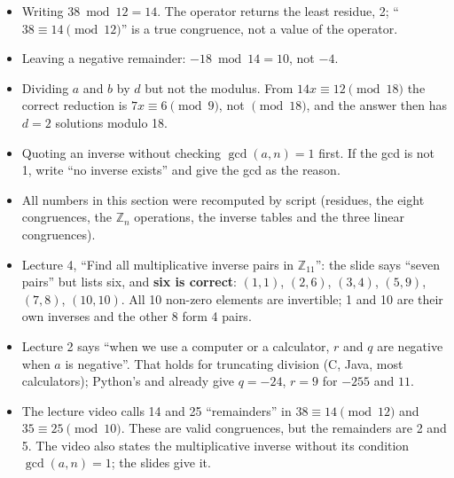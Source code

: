 \begin{trap}
\begin{itemize}[leftmargin=1.5em]
  \item Writing $38 \bmod 12 = 14$. The operator returns the least residue, 2; ``$38 \equiv 14 \pmod{12}$'' is a true congruence, not a value of the operator.
  \item Leaving a negative remainder: $-18 \bmod 14 = 10$, not $-4$.
  \item Dividing $a$ and $b$ by $d$ but not the modulus. From $14x \equiv 12 \pmod{18}$ the correct reduction is $7x \equiv 6 \pmod 9$, not $\pmod{18}$, and the answer then has $d = 2$ solutions modulo 18.
  \item Quoting an inverse without checking $\gcd(a, n) = 1$ first. If the gcd is not 1, write ``no inverse exists'' and give the gcd as the reason.
\end{itemize}
\end{trap}

\begin{fixbox}
\begin{itemize}
  \item All numbers in this section were recomputed by script (residues, the eight congruences, the $\mathbb{Z}_n$ operations, the inverse tables and the three linear congruences).
  \item Lecture 4, ``Find all multiplicative inverse pairs in $\mathbb{Z}_{11}$'': the slide says ``seven pairs'' but lists six, and \textbf{six is correct}: $(1, 1)$, $(2, 6)$, $(3, 4)$, $(5, 9)$, $(7, 8)$, $(10, 10)$. All 10 non-zero elements are invertible; 1 and 10 are their own inverses and the other 8 form 4 pairs.
  \item Lecture 2 says ``when we use a computer or a calculator, $r$ and $q$ are negative when $a$ is negative''. That holds for truncating division (C, Java, most calculators); Python's \ttx{//} and \ttx{\%} already give $q = -24$, $r = 9$ for $-255$ and $11$.
  \item The lecture video calls 14 and 25 ``remainders'' in $38 \equiv 14 \pmod{12}$ and $35 \equiv 25 \pmod{10}$. These are valid congruences, but the remainders are 2 and 5. The video also states the multiplicative inverse without its condition $\gcd(a, n) = 1$; the slides give it.
\end{itemize}
\end{fixbox}
